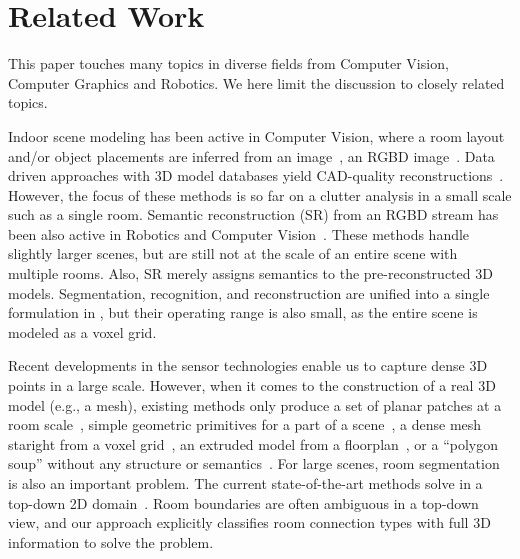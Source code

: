 \section{Related Work}
This paper touches many topics in diverse fields from Computer
Vision, Computer Graphics and Robotics.
We here limit the discussion to closely related topics.

 Indoor scene modeling has
been active in Computer Vision, where a room layout and/or object
placements are inferred from an
image~\cite{Hedau2009,fouhey2013data}, an RGBD
image~\cite{Hoiem13,cornel_indoor_13}. Data driven
approaches with 3D model databases yield CAD-quality
reconstructions~\cite{cad_matching_12,search_classify_12}. However, the
focus of these methods is so far on a clutter analysis in a small scale
such as a single room.
%
Semantic reconstruction (SR) from an RGBD stream has been also active in
Robotics and Computer
Vision~\cite{jia20133d,herbst2014toward}. These
methods handle slightly larger scenes, but are still not at the scale of
an entire scene with multiple rooms. Also, SR merely assigns semantics
to the pre-reconstructed 3D models. Segmentation, recognition, and
reconstruction are unified into a single formulation in
\cite{hane2013joint}, but their operating range is also small, as the
entire scene is modeled as a voxel grid.

Recent developments in the sensor technologies enable us to capture
dense 3D points in a large scale.
However, when it comes to the construction of a real 3D model (e.g., a
mesh), existing methods only produce a set of planar patches at a room
scale~\cite{xiong2013automatic}, simple geometric
primitives for a part of a scene~\cite{mani_progress_monitoring}, a
dense mesh staright from a voxel grid~\cite{Turner2015}, an extruded
model from a floorplan~\cite{Turner2015}, or a ``polygon soup'' without
any structure or semantics~\cite{eccv_museum}.
%
%
For large scenes, room segmentation is also an important problem. The
current state-of-the-art methods solve in a top-down 2D
domain~\cite{Turner2015,Mura2014}. Room boundaries are often ambiguous in
a top-down view, and our approach explicitly classifies room connection
types with full 3D information to solve the problem.


